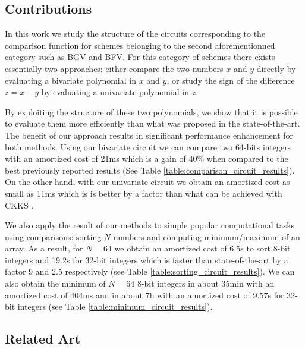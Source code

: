 \subsection{Contributions}
In this work we study the structure of the circuits corresponding to the comparison function for schemes belonging to the second aforementionned category such as BGV and BFV. For this category of schemes there exists essentially two approaches: either compare the two numbers $x$ and $y$ directly by evaluating a bivariate polynomial in $x$ and $y$, or study the sign of the difference $z=x-y$ by evaluating a univariate polynomial in $z$.

By exploiting the structure of these two polynomials, we show that it is possible to evaluate them more efficiently than what was proposed in the state-of-the-art. The benefit of our approach results in significant performance enhancement for both methods. Using our bivariate circuit we can compare two 64-bits integers with an amortized cost of 21ms which is a gain of $40\%$ when compared to the best previously reported results (See Table \ref{table:comparison_circuit_results}). On the other hand, with our univariate circuit we obtain an amortized cost as small as 11ms which is is better by a factor  than what can be achieved with CKKS . 

We also apply the result of our methods to simple popular computational tasks using comparisons: sorting $N$ numbers and computing minimum/maximum of an array. As a result, for $N=64$ we obtain an amortized cost of 6.5s to sort 8-bit integers and 19.2s for 32-bit integers which is faster than state-of-the-art by a factor 9 and 2.5 respectively (see Table \ref{table:sorting_circuit_results}). We can also obtain the minimum of $N=64$ 8-bit integers in about 35min with an amortized cost of 404ms and in about 7h with an amortized cost of 9.57s for 32-bit integers (see Table \ref{table:minimum_circuit_results}).

\subsection{Related Art}
\label{sec:related-art}





